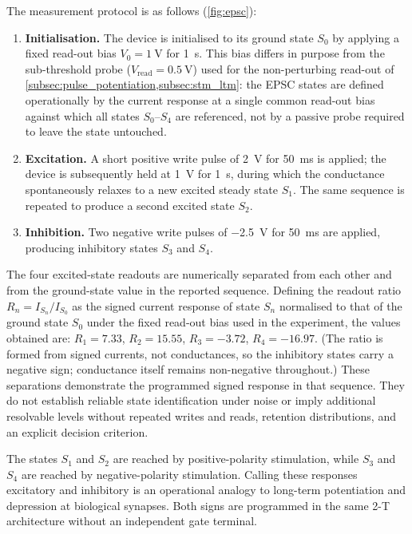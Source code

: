 \documentclass[12pt, twoside]{report}
\begin{document}
The measurement protocol is as follows (\cref{fig:epsc}):
\begin{enumerate}
  \item \textbf{Initialisation.} The device is initialised to its ground state $S_0$ by applying a fixed read-out bias $V_0 = \SI{+1}{\volt}$ for \SI{1}{\second}. This bias differs in purpose from the sub-threshold probe ($V_{\mathrm{read}} = \SI{0.5}{\volt}$) used for the non-perturbing read-out of \cref{subsec:pulse_potentiation,subsec:stm_ltm}: the EPSC states are defined operationally by the current response at a single common read-out bias against which all states $S_0$--$S_4$ are referenced, not by a passive probe required to leave the state untouched.
  \item \textbf{Excitation.} A short positive write pulse of \SI{+2}{\volt} for \SI{50}{\milli\second} is applied; the device is subsequently held at \SI{+1}{\volt} for \SI{1}{\second}, during which the conductance spontaneously relaxes to a new excited steady state $S_1$. The same sequence is repeated to produce a second excited state $S_2$.
  \item \textbf{Inhibition.} Two negative write pulses of \SI{-2.5}{\volt} for \SI{50}{\milli\second} are applied, producing inhibitory states $S_3$ and $S_4$.
\end{enumerate}

The four excited-state readouts are numerically separated from each other and from the ground-state value in the reported sequence. Defining the \EPSC{} readout ratio $R_n = I_{S_n}/I_{S_0}$ as the signed current response of state $S_n$ normalised to that of the ground state $S_0$ under the fixed read-out bias used in the experiment, the values obtained are: $R_1 = 7.33$, $R_2 = 15.55$, $R_3 = -3.72$, $R_4 = -16.97$. (The ratio is formed from signed currents, not conductances, so the inhibitory states carry a negative sign; conductance itself remains non-negative throughout.) These separations demonstrate the programmed signed response in that sequence. They do not establish reliable state identification under noise or imply additional resolvable levels without repeated writes and reads, retention distributions, and an explicit decision criterion.

The states \(S_1\) and \(S_2\) are reached by positive-polarity stimulation, while \(S_3\) and \(S_4\) are reached by negative-polarity stimulation. Calling these responses excitatory and inhibitory is an operational analogy to long-term potentiation and depression at biological synapses. Both signs are programmed in the same 2-T architecture without an independent gate terminal.
\end{document}
